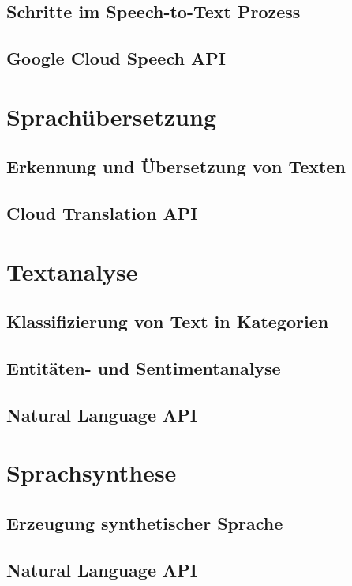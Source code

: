 \documentclass[12pt,a4paper]{article}
\begin{document}
\subsection{Schritte im Speech-to-Text Prozess}
\subsection{Google Cloud Speech API}


\newpage

\section{Sprachübersetzung}
\subsection{Erkennung und Übersetzung von Texten}
\subsection{Cloud Translation API}

\newpage

\section{Textanalyse}
\subsection{Klassifizierung von Text in Kategorien}
\subsection{Entitäten- und Sentimentanalyse}
\subsection{Natural Language API}

\newpage

\section{Sprachsynthese}
\subsection{Erzeugung synthetischer Sprache}
\subsection{Natural Language API}

\newpage
\thispagestyle{empty}
\printbibliography
\end{document}
